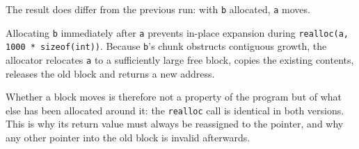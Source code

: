 
The result does differ from the previous run: with \texttt{b} allocated,
\texttt{a} moves.

Allocating \texttt{b} immediately after \texttt{a} prevents in-place expansion
during \texttt{realloc(a, 1000 * sizeof(int))}. Because \texttt{b}'s chunk
obstructs contiguous growth, the allocator relocates \texttt{a} to a
sufficiently large free block, copies the existing contents, releases the old
block and returns a new address.

Whether a block moves is therefore not a property of the program but of what
else has been allocated around it: the \texttt{realloc} call is identical in
both versions. This is why its return value must always be reassigned to the
pointer, and why any other pointer into the old block is invalid afterwards.
